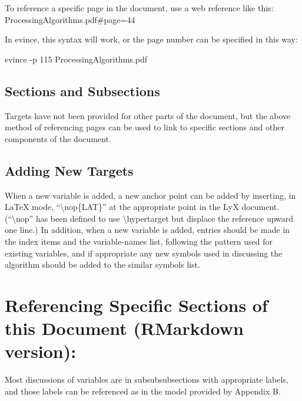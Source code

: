 \documentclass[
  english,
]{book}
\begin{document}
To reference a specific page in the document, use a web reference like
this: ProcessingAlgorithms.pdf\#page=44

In evince, this syntax will work, or the page number can be specified in
this way:

evince -p 115 ProcessingAlgorithms.pdf

\hypertarget{sections-and-subsections}{%
\subsection*{Sections and Subsections}\label{sections-and-subsections}}

Targets have not been provided for other parts of the document, but the
above method of referencing pages can be used to link to specific
sections and other components of the document.

\hypertarget{adding-new-targets}{%
\subsection*{Adding New Targets}\label{adding-new-targets}}

When a new variable is added, a new anchor point can be added by
inserting, in LaTeX mode, ``\textbackslash nop\{LAT\}'' at the
appropriate point in the LyX document. (``\textbackslash nop'' has been
defined to use \textbackslash hypertarget but displace the reference
upward one line.) In addition, when a new variable is added, entries
should be made in the index items and the variable-names list, following
the pattern used for existing variables, and if appropriate any new
symbols used in discussing the algorithm should be added to the similar
symbols list.

\hypertarget{referencing-specific-sections-of-this-document-rmarkdown-version}{%
\section*{Referencing Specific Sections of this Document (RMarkdown
version):}\label{referencing-specific-sections-of-this-document-rmarkdown-version}}

Most discussions of variables are in subsubsubsections with appropriate
labels, and those labels can be referenced as in the model provided by
Appendix B.
\end{document}

